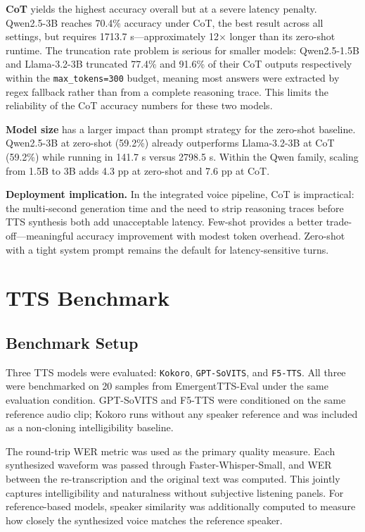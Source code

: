\documentclass[12pt, a4paper]{article}
\begin{document}
\textbf{CoT} yields the highest accuracy overall but at a severe latency penalty. Qwen2.5-3B reaches 70.4\% accuracy under CoT, the best result across all settings, but requires 1713.7 s---approximately 12$\times$ longer than its zero-shot runtime. The truncation rate problem is serious for smaller models: Qwen2.5-1.5B and Llama-3.2-3B truncated 77.4\% and 91.6\% of their CoT outputs respectively within the \texttt{max\_tokens=300} budget, meaning most answers were extracted by regex fallback rather than from a complete reasoning trace. This limits the reliability of the CoT accuracy numbers for these two models.

\textbf{Model size} has a larger impact than prompt strategy for the zero-shot baseline. Qwen2.5-3B at zero-shot (59.2\%) already outperforms Llama-3.2-3B at CoT (59.2\%) while running in 141.7 s versus 2798.5 s. Within the Qwen family, scaling from 1.5B to 3B adds 4.3 pp at zero-shot and 7.6 pp at CoT.

\textbf{Deployment implication.} In the integrated voice pipeline, CoT is impractical: the multi-second generation time and the need to strip reasoning traces before TTS synthesis both add unacceptable latency. Few-shot provides a better trade-off---meaningful accuracy improvement with modest token overhead. Zero-shot with a tight system prompt remains the default for latency-sensitive turns.

\section{TTS Benchmark}

\subsection{Benchmark Setup}

Three TTS models were evaluated: \texttt{Kokoro}, \texttt{GPT-SoVITS}, and \texttt{F5-TTS}. All three were benchmarked on 20 samples from EmergentTTS-Eval under the same evaluation condition. GPT-SoVITS and F5-TTS were conditioned on the same reference audio clip; Kokoro runs without any speaker reference and was included as a non-cloning intelligibility baseline.

The round-trip WER metric was used as the primary quality measure. Each synthesized waveform was passed through Faster-Whisper-Small, and WER between the re-transcription and the original text was computed. This jointly captures intelligibility and naturalness without subjective listening panels. For reference-based models, speaker similarity was additionally computed to measure how closely the synthesized voice matches the reference speaker.
\end{document}
